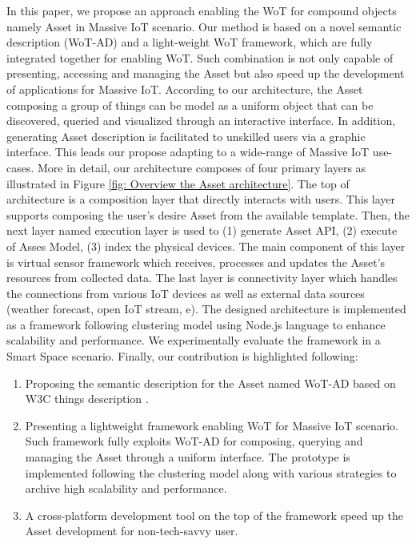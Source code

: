 In this paper, we propose an approach enabling the WoT for compound objects namely Asset in Massive IoT scenario. Our method is based on a novel semantic description (WoT-AD) and a light-weight WoT framework, which are fully integrated together for enabling WoT. Such combination is not only capable of presenting, accessing and managing the Asset but also speed up the development of applications for Massive IoT. 
According to our architecture, the Asset composing a group of things can be model as a uniform object that can be discovered, queried and visualized through an interactive interface. 
In addition, generating Asset description is facilitated to unskilled users via a graphic interface. This leads our propose adapting to a wide-range of Massive IoT use-cases. More in detail, our architecture composes of four primary layers as illustrated in Figure \ref{fig: Overview the Asset architecture}. The top of architecture is a composition layer that directly interacts with users. This layer supports composing the user's desire Asset from the available template. Then, the next layer named execution layer is used to (1) generate Asset API, (2) execute of Asses Model, (3) index the physical devices. The main component of this layer is virtual sensor framework which receives, processes and updates the Asset's resources from collected data. The last layer is connectivity layer which handles the connections from various IoT devices as well as external data sources (weather forecast, open IoT stream, e). The designed architecture is implemented as a framework following clustering model using Node.js language to enhance scalability and performance. We experimentally evaluate the framework in a Smart Space scenario. Finally, our contribution is highlighted following:
\begin{enumerate}
	\item Proposing the semantic description for the Asset named WoT-AD based on W3C things description \cite{W3C_TD}.
	\item Presenting a lightweight framework enabling WoT for Massive IoT scenario. Such framework fully exploits WoT-AD for composing, querying and managing the Asset through a uniform interface. The prototype is implemented following the clustering model along with various strategies to archive high scalability and performance.
	\item A cross-platform development tool on the top of the framework speed up the Asset development for non-tech-savvy user. 
\end{enumerate}

